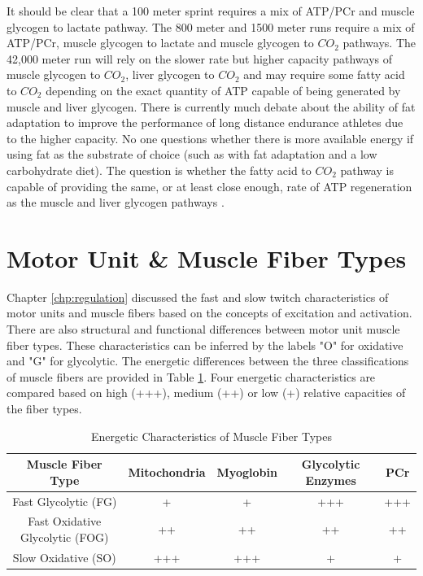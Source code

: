 It should be clear that a 100 meter sprint requires a mix of ATP/PCr and muscle glycogen to lactate pathway. The 800 meter and 1500 meter runs require a mix of ATP/PCr, muscle glycogen to lactate and muscle glycogen to $CO_2$ pathways. The 42,000 meter run will rely on the slower rate but higher capacity pathways of muscle glycogen to $CO_2$, liver glycogen to $CO_2$ and may require some fatty acid to $CO_2$ depending on the exact quantity of ATP capable of being generated by muscle and liver glycogen. There is currently much debate about the ability of fat adaptation to improve the performance of long distance endurance athletes due to the higher capacity. No one questions whether there is more available energy if using fat as the substrate of choice (such as with fat adaptation and a low carbohydrate diet). The question is whether the fatty acid to $CO_2$ pathway is capable of providing the same, or at least close enough, rate of ATP regeneration as the muscle and liver glycogen pathways \cite{mcswiney_keto-adaptation_2018}.

\section{Motor Unit \& Muscle Fiber Types}

Chapter \ref{chp:regulation} discussed the fast and slow twitch characteristics of motor units and muscle fibers based on the concepts of excitation and activation. There are also structural and functional differences between motor unit muscle fiber types. These characteristics can be inferred by the labels "O" for oxidative and "G" for glycolytic. The energetic differences between the three classifications of muscle fibers are provided in Table \ref{table:Muscle_Fiber_Energetics}. Four energetic characteristics are compared based on high (+++), medium (++) or low (+) relative capacities of the fiber types. 

\begin{table}[h!]
\centering
\begin{tabular}{||c c c c c||} 
 \hline
 Muscle Fiber Type & Mitochondria & Myoglobin & Glycolytic Enzymes & PCr \\ [0.5ex] 
 \hline\hline
 Fast Glycolytic (FG)  & + & + & +++ & +++ \\ 
 Fast Oxidative Glycolytic (FOG) & ++ & ++ & ++ & ++ \\
 Slow Oxidative (SO) &  +++ & +++ & + & + \\ [1ex] 
 \hline
\end{tabular}
\caption{Energetic Characteristics of Muscle Fiber Types}
\label{table:Muscle_Fiber_Energetics}
\end{table}

